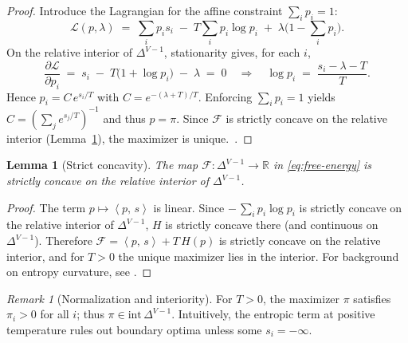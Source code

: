 \documentclass[10pt,a4paper]{amsart}
\numberwithin{equation}{section}
\theoremstyle{plain}
\newtheorem{lemma}[theorem]{Lemma}
\theoremstyle{definition}
\theoremstyle{remark}
\newtheorem{remark}[theorem]{Remark}
\newcommand{\R}{\mathbb{R}}
\newcommand{\1}{\mathbbm{1}}
\newcommand{\ip}[2]{\left\langle #1,\, #2 \right\rangle}
\newcommand{\Hent}{H}
\newcommand{\simplex}{\Delta^{V-1}}
\begin{document}
\begin{proof}
Introduce the Lagrangian for the affine constraint $\sum_i p_i=1$:
\[
\mathcal{L}(p,\lambda)\;=\;\sum_i p_i s_i \;-\; T\sum_i p_i\log p_i \;+\; \lambda\Big(1-\sum_i p_i\Big).
\]
On the relative interior of $\simplex$, stationarity gives, for each $i$,
\[
\frac{\partial \mathcal{L}}{\partial p_i}\;=\; s_i \;-\; T\big(1+\log p_i\big)\;-\;\lambda \;=\; 0
\quad\Rightarrow\quad
\log p_i\;=\;\frac{s_i-\lambda - T}{T}.
\]
Hence $p_i = C\,e^{s_i/T}$ with $C=e^{-(\lambda+T)/T}$. Enforcing $\sum_i p_i=1$ yields
$C=(\sum_j e^{s_j/T})^{-1}$ and thus $p=\pi$. Since $\mathcal{F}$ is strictly concave on the relative interior (Lemma~\ref{lem:strict-concavity}), the maximizer is unique.\ \citep[See also the classical Gibbs principle in][]{jaynes1957information,cover2006elements}.
\end{proof}

\begin{lemma}[Strict concavity]\label{lem:strict-concavity}
The map $\mathcal{F}:\simplex\to\R$ in \eqref{eq:free-energy} is strictly concave on the relative interior of $\simplex$.
\end{lemma}

\begin{proof}
The term $p\mapsto \ip{p}{s}$ is linear. Since $-\,\sum_i p_i\log p_i$ is strictly concave on the relative interior of $\simplex$, $\Hent$ is strictly concave there (and continuous on $\simplex$). Therefore $\mathcal{F}=\ip{p}{s}+T\,\Hent(p)$ is strictly concave on the relative interior, and for $T>0$ the unique maximizer lies in the interior. For background on entropy curvature, see \citet[§3.1.4]{boyd2004convex}.
\end{proof}

\begin{remark}[Normalization and interiority]\label{rem:interior}
For $T>0$, the maximizer $\pi$ satisfies $\pi_i>0$ for all $i$; thus $\pi\in\mathrm{int}\,\simplex$. Intuitively, the entropic term at positive temperature rules out boundary optima unless some $s_i=-\infty$.
\end{remark}
\end{document}
